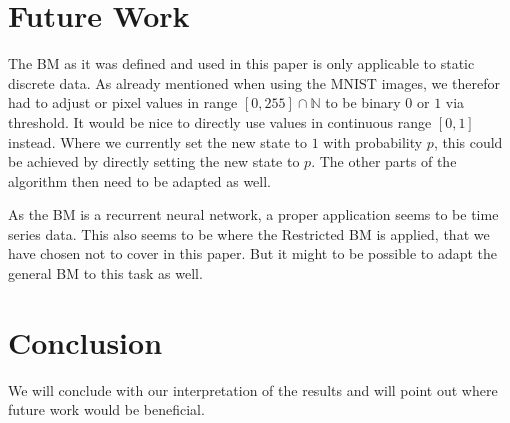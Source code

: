 \documentclass[12pt,twoside]{article}
\theoremstyle{plain}
\theoremstyle{definition}
\theoremstyle{remark}
\begin{document}
%


\section{Future Work}
\label{sec:future}


The BM as it was defined and used in this paper is only applicable to static discrete data. As already mentioned when using the MNIST images, we therefor had to adjust or pixel values in range $[0,255]\cap\mathbb{N}$ to be binary $0$ or $1$ via threshold. It would be nice to directly use values in continuous range $[0,1]$ instead. Where we currently set the new state to $1$ with probability $p$, this could be achieved by directly setting the new state to $p$. The other parts of the algorithm then need to be adapted as well.

As the BM is a recurrent neural network, a proper application seems to be time series data. This also seems to be where the Restricted BM is applied, that we have chosen not to cover in this paper. But it might to be possible to adapt the general BM to this task as well.


\section{Conclusion}
\label{sec:concl}

We will conclude with our interpretation of the results and will point out where future work would be beneficial.


%
%
\newpage


\end{document}
